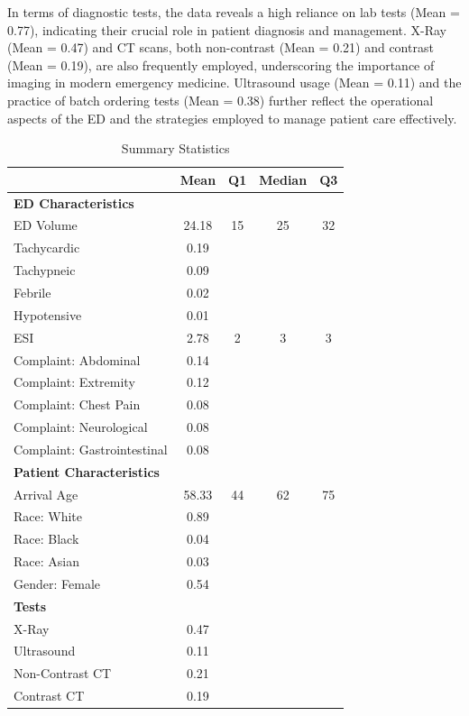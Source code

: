 \documentclass[,,nonblindrev]{informs}
\begin{document}
In terms of diagnostic tests, the data reveals a high reliance on lab
tests (Mean = 0.77), indicating their crucial role in patient diagnosis
and management. X-Ray (Mean = 0.47) and CT scans, both non-contrast
(Mean = 0.21) and contrast (Mean = 0.19), are also frequently employed,
underscoring the importance of imaging in modern emergency medicine.
Ultrasound usage (Mean = 0.11) and the practice of batch ordering tests
(Mean = 0.38) further reflect the operational aspects of the ED and the
strategies employed to manage patient care effectively.

\begin{table}[ht]
\centering
\caption{Summary Statistics}
\label{tab:summary_statistics}
\begin{tabular}{p{10.5cm}cccc}
\toprule
\textbf{} & \textbf{Mean} & \textbf{Q1} & \textbf{Median} & \textbf{Q3} \\
\midrule
\multicolumn{5}{l}{\textbf{ED Characteristics}} \\
ED Volume & 24.18 & 15 & 25 & 32 \\
Tachycardic & 0.19 & & & \\
Tachypneic & 0.09 & & & \\
Febrile & 0.02 & & & \\
Hypotensive & 0.01 & & & \\ 
ESI & 2.78 & 2 & 3 & 3 \\
Complaint: Abdominal & 0.14 & & & \\
Complaint: Extremity & 0.12 & & & \\
Complaint: Chest Pain & 0.08 & & & \\
Complaint: Neurological & 0.08 & & & \\
Complaint: Gastrointestinal & 0.08 & & & \\
\midrule
\multicolumn{5}{l}{\textbf{Patient Characteristics}} \\
Arrival Age & 58.33 & 44 & 62 & 75 \\
Race: White & 0.89 & & & \\
Race: Black & 0.04 & & & \\
Race: Asian & 0.03 & & & \\
Gender: Female & 0.54 & & & \\
\midrule
\multicolumn{5}{l}{\textbf{Tests}} \\
X-Ray & 0.47 & & & \\
Ultrasound & 0.11 & & & \\
Non-Contrast CT & 0.21 & & & \\
Contrast CT & 0.19 & & & \\

\end{tabular}
\end{table}
\end{document}
